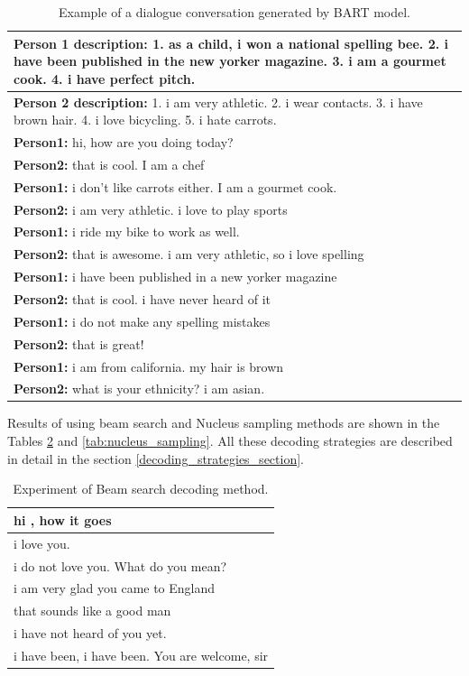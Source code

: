 \begin{table}
\centering
 \begin{tabular}{|p{14cm}|}
 \hline
 \textbf{Person 1 description:} 1. as a child, i won a national spelling bee. 2. i have been published in the new yorker magazine. 3. i am a gourmet cook. 4. i have perfect pitch. \\
 \hline
 \textbf{Person 2 description:} 1. i am very athletic. 2. i wear contacts. 3. i have brown hair. 4. i love bicycling. 5. i hate carrots. \\
 \hline
 \textbf{Person1:} hi, how are you doing today?  \\
 \textbf{Person2:} that is cool. I am a chef  \\ 
 \textbf{Person1:} i don't like carrots either. I am a gourmet cook. \\
 \textbf{Person2:} i am very athletic. i love to play sports \\
 \textbf{Person1:} i ride my bike to work as well. \\
 \textbf{Person2:} that is awesome. i am very athletic, so i love spelling \\
 \textbf{Person1:} i have been published in a new yorker magazine \\
 \textbf{Person2:} that is cool. i have never heard of it \\
 \textbf{Person1:} i do not make any spelling mistakes\\
 \textbf{Person2:} that is great! \\
 \textbf{Person1:} i am from california. my hair is brown \\
 \textbf{Person2:} what is your ethnicity? i am asian. \\
 \hline
 \end{tabular}
 \caption{Example of a dialogue conversation generated by BART model.}
\label{tab:bart_experiment}
\end{table}

Results of using beam search and Nucleus sampling methods are shown in the Tables \ref{tab:beam_search} and \ref{tab:nucleus_sampling}. All these decoding strategies are described in detail in the section \ref{decoding_strategies_section}.

\begin{table}
\centering
 \begin{tabular}{|p{14cm}|} 
 \hline
 hi , how it goes \\
 \hline
 i love you. \\
 \hline
 i do not love you. What do you mean? \\
 \hline 
 i am very glad you came to England \\
 \hline 
 that sounds like a good man \\
 \hline 
 i have not heard of you yet. \\
 \hline 
 i have been, i have been. You are welcome, sir \\
 \hline
 \end{tabular}
 \caption{Experiment of Beam search decoding method.}
\label{tab:beam_search}
\end{table}

